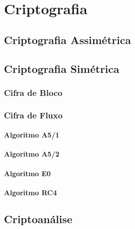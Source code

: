 \chapter{Criptografia}
\label{cryptograhy}

\section{Criptografia Assimétrica}
\label{assymmetric-cryptography}

\section{Criptografia Simétrica}
\label{symmetric-cryptography}

\subsection{Cifra de Bloco}
\label{block-cipher}

\subsection{Cifra de Fluxo}
\label{stream-cipher}

\subsubsection{Algoritmo A5/1}
\label{algorithm-a51}

\subsubsection{Algoritmo A5/2}
\label{algorithm-a52}

\subsubsection{Algoritmo E0}
\label{algorithm-e0}

\subsubsection{Algoritmo RC4}
\label{algorithm-rc4}

\section{Criptoanálise}